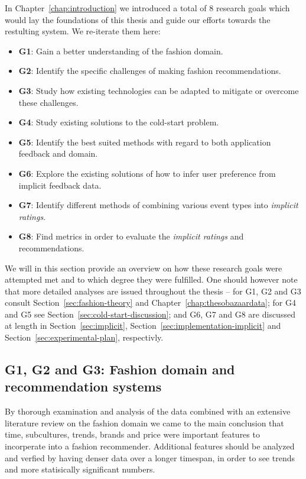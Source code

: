 In Chapter~\ref{chap:introduction} we introduced a total of 8 research goals
which would lay the foundations of this thesis and guide our efforts towards
the restulting system. We re-iterate them here:

\begin{itemize}
\item \textbf{G1}: Gain a better understanding of the fashion domain.
\item \textbf{G2}: Identify the specific challenges of making fashion recommendations.
\item \textbf{G3}: Study how existing technologies can be adapted to mitigate or
overcome these challenges.
\vfill
\item \textbf{G4}: Study existing solutions to the cold-start problem.
\item \textbf{G5}: Identify the best suited methods with regard to both application
feedback and domain.
\vfill
\item \textbf{G6}: Explore the existing solutions of how to infer user preference from
implicit feedback data.
\item \textbf{G7}: Identify different methods of combining various event types into
\textit{implicit ratings}.
\item \textbf{G8}: Find metrics in order to evaluate the \emph{implicit ratings} and
recommendations.
\end{itemize}

We will in this section provide an overview on how these research goals were
attempted met and to which degree they were fulfilled. One should however note
that more detailed analyses are issued throughout the thesis -- for G1, G2 and
G3 consult Section~\ref{sec:fashion-theory} and
Chapter~\ref{chap:thesobazaardata}; for G4 and G5 see
Section~\ref{sec:cold-start-discussion}; and G6, G7 and G8 are discussed at
length in Section~\ref{sec:implicit}, Section~\ref{sec:implementation-implicit} and
Section~\ref{sec:experimental-plan}, respectivly.

\subsection{G1, G2 and G3: Fashion domain and recommendation systems}
\label{sec:fashion-discussion}

By thorough examination and analysis of the data combined with an extensive
literature review on the fashion domain we came to the main conclusion that
time, subcultures, trends, brands and price were important features to
incorperate into a fashion recommender. Additional features should be analyzed
and verfied by having denser data over a longer timespan, in order to see
trends and more statisically significant numbers.

